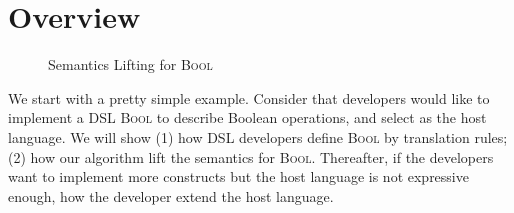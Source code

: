 \section{Overview}

\begin{figure}
  
  \caption{Semantics Lifting for \textsc{Bool}}
  \label{fig:bool-layer}
\end{figure}



We start with a pretty simple example.
Consider that developers would like to implement a DSL \textsc{Bool} to describe Boolean operations,
 and select \STLC{} as the host language.
We will show 
(1) how DSL developers define \textsc{Bool} by translation rules;
(2) how our algorithm lift the semantics for \textsc{Bool}.
Thereafter, if the developers want to implement more constructs
 but the host language is not expressive enough,
 how the developer extend the host language.



